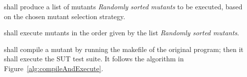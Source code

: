 
\RQ{} \FAQAS shall produce a list of mutants \emph{Randomly sorted mutants} to be executed, based on the chosen mutant selection strategy.


\RQ{} \FAQAS shall execute mutants in the order given by the list \textit{Randomly sorted mutants}.


\RQ{} \FAQAS shall compile a mutant by running the makefile of the original program; then it shall execute the SUT test suite. It follows the algorithm in Figure~\ref{alg:compileAndExecute}.


